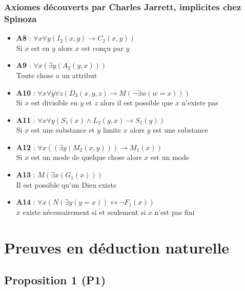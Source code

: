 \documentclass[10pt,a3paper]{article}
\begin{document}
\subsubsection*{Axiomes découverts par Charles Jarrett, implicites chez Spinoza}
    
\begin{itemize}
    \item \textbf{A8} : $\forall x \forall y (I_2(x,y) \rightarrow C_2(x,y))$ \\
    Si $x$ est en $y$ alors $x$ est conçu par $y$
    
    \item \textbf{A9} : $\forall x (\exists y (A_2(y,x)))$ \\
    Toute chose a un attribut
    
    \item \textbf{A10} : $\forall x \forall y \forall z (D_3(x,y,z) \rightarrow M(\neg \exists w (w = x)))$ \\
    Si $x$ est divisible en $y$ et $z$ alors il est possible que $x$ n'existe pas
    
    \item \textbf{A11} : $\forall x \forall y (S_1(x) \land L_2(y,x) \rightarrow S_1(y))$ \\
    Si $x$ est une substance et $y$ limite $x$ alors $y$ est une substance
    
    \item \textbf{A12} : $\forall x ((\exists y (M_2(x,y))) \rightarrow M_1(x))$ \\
    Si $x$ est un mode de quelque chose alors $x$ est un mode
    
    \item \textbf{A13} : $M(\exists x (G_1(x)))$ \\
    Il est possible qu'un Dieu existe
    
    \item \textbf{A14} : $\forall x (N(\exists y (y = x)) \leftrightarrow \neg F_1(x))$ \\
    $x$ existe nécessairement si et seulement si $x$ n'est pas fini
\end{itemize}

\clearpage

\section{Preuves en déduction naturelle}

\subsection{Proposition 1 (P1)}
\end{document}
